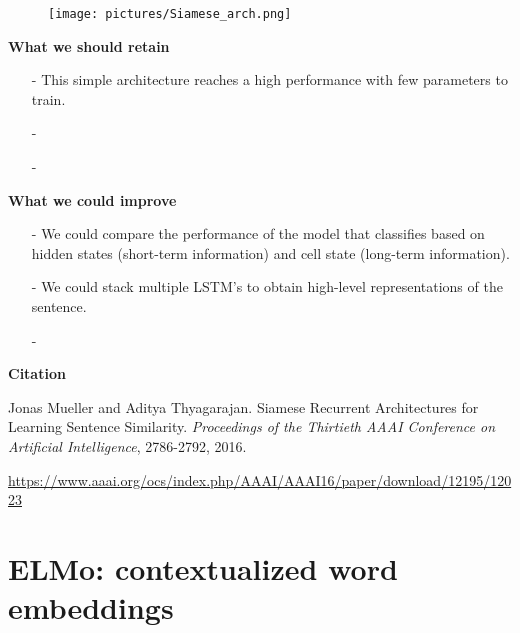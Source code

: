 \begin{figure}[h]
    \centering
    \texttt{[image: pictures/Siamese\_arch.png]}
\end{figure}


\textbf{What we should retain}

\begin{enumerate}[topsep = 0pt, itemsep = 0pt]
    \item[-] This simple architecture reaches a high performance with few parameters to train.
    
    \item[-] 
    
    \item[-]
    
\end{enumerate}


\textbf{What we could improve}

\begin{enumerate}[topsep = 0pt, itemsep = 0pt]
    \item[-] We could compare the performance of the model that classifies based on hidden states (short-term information) and cell state (long-term information).
    
    \item[-] We could stack multiple LSTM's to obtain high-level representations of the sentence.
    
    \item[-]
    
\end{enumerate}


\textbf{Citation}

    Jonas Mueller and Aditya Thyagarajan.
    Siamese Recurrent Architectures for Learning Sentence Similarity.
    \textit{Proceedings of the Thirtieth AAAI Conference on Artificial Intelligence}, 2786-2792, 2016.


\url{https://www.aaai.org/ocs/index.php/AAAI/AAAI16/paper/download/12195/12023}




\newpage
\section{ELMo: contextualized word embeddings}


